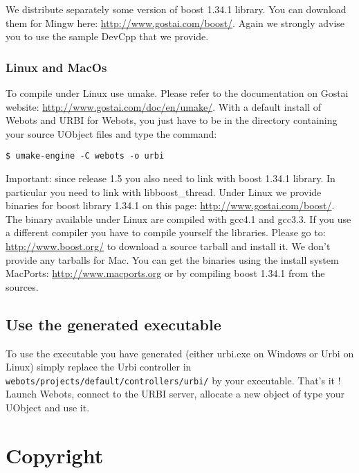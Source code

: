 We distribute separately some version of boost 1.34.1 library. You can
download them for Mingw here: \url{http://www.gostai.com/boost/}.
Again we strongly advise you to use the sample DevCpp that we provide.


\subsubsection{Linux and MacOs}
\label{webots.ownuobjects.compile.linux}%

To compile under Linux use umake. Please refer to the documentation on
Gostai website: \url{http://www.gostai.com/doc/en/umake/}.  With a
default install of Webots and URBI for Webots, you just have to be in
the directory containing your source UObject files and type the
command:

\begin{lstlisting}[firstnumber=1,]
$ umake-engine -C webots -o urbi
\end{lstlisting}


Important: since release 1.5 you also need to link with boost 1.34.1
library.  In particular you need to link with libboost\_thread. Under
Linux we provide binaries for boost library 1.34.1 on this page:
\url{http://www.gostai.com/boost/}. The binary available under Linux
are compiled with gcc4.1 and gcc3.3. If you use a different compiler
you have to compile yourself the libraries. Please go to:
\url{http://www.boost.org/} to download a source tarball and install
it.  We don't provide any tarballs for Mac. You can get the binaries
using the install system MacPorts: \url{http://www.macports.org} or by
compiling boost 1.34.1 from the sources.


\subsection{Use the generated executable}
\label{webots.ownuobjects.use}%

To use the executable you have generated (either urbi.exe on Windows
or Urbi on Linux) simply replace the Urbi controller in
\nolinkurl{webots/projects/default/controllers/urbi/} by your
executable. That's it ! Launch Webots, connect to the URBI server,
allocate a new object of type your UObject and use it.

\appendix
\section{Copyright}
\label{webots.copyright}%

